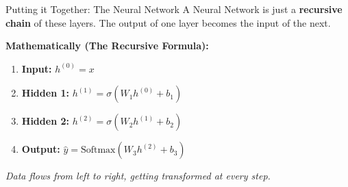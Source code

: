 \begin{frame}{Putting it Together: The Neural Network}
    A Neural Network is just a \textbf{recursive chain} of these layers. 
    The output of one layer becomes the input of the next.
    
    \vspace{1em}
    \centering
    
    \vspace{1.5em}
    \raggedright
    \textbf{Mathematically (The Recursive Formula):}
    
    \begin{enumerate}
        \item \textbf{Input:} $h^{(0)} = x$
        \item \textbf{Hidden 1:} $h^{(1)} = \sigma(W_1 h^{(0)} + b_1)$
        \item \textbf{Hidden 2:} $h^{(2)} = \sigma(W_2 h^{(1)} + b_2)$
        \item \textbf{Output:} $\hat{y} = \text{Softmax}(W_3 h^{(2)} + b_3)$
    \end{enumerate}
    
    \vspace{0.5em}
    \small \textit{Data flows from left to right, getting transformed at every step.}
\end{frame}


